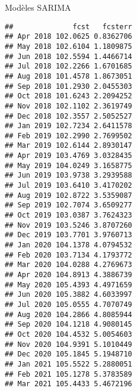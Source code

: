 \documentclass[10pt,xcolor=table,color={dvipsnames,usenames},ignorenonframetext,usepdftitle=false,french]{beamer}
\newenvironment{Shaded}{\begin{snugshade}}{\end{snugshade}}
\newcommand{\CommentTok}[1]{\textcolor[rgb]{0.56,0.35,0.01}{\textit{#1}}}
\newcommand{\DataTypeTok}[1]{\textcolor[rgb]{0.13,0.29,0.53}{#1}}
\newcommand{\DecValTok}[1]{\textcolor[rgb]{0.00,0.00,0.81}{#1}}
\newcommand{\KeywordTok}[1]{\textcolor[rgb]{0.13,0.29,0.53}{\textbf{#1}}}
\newcommand{\NormalTok}[1]{#1}
\newcommand{\OperatorTok}[1]{\textcolor[rgb]{0.81,0.36,0.00}{\textbf{#1}}}
\newcommand{\StringTok}[1]{\textcolor[rgb]{0.31,0.60,0.02}{#1}}
\begin{document}
\begin{frame}[fragile]{Modèles SARIMA}
\protect\hypertarget{moduxe8les-sarima-4}{}

\footnotesize

\begin{Shaded}
\end{Shaded}

\begin{verbatim}
##              fcst   fcsterr
## Apr 2018 102.0625 0.8362706
## May 2018 102.6104 1.1809875
## Jun 2018 102.5594 1.4466714
## Jul 2018 102.2266 1.6701685
## Aug 2018 101.4578 1.8673051
## Sep 2018 101.2930 2.0455303
## Oct 2018 101.6243 2.2094252
## Nov 2018 102.1102 2.3619749
## Dec 2018 102.3557 2.5052527
## Jan 2019 102.7234 2.6411578
## Feb 2019 102.2990 2.7699502
## Mar 2019 102.6144 2.8930147
## Apr 2019 103.4769 3.0328435
## May 2019 104.0249 3.1658775
## Jun 2019 103.9738 3.2939588
## Jul 2019 103.6410 3.4170202
## Aug 2019 102.8722 3.5359087
## Sep 2019 102.7074 3.6509277
## Oct 2019 103.0387 3.7624323
## Nov 2019 103.5246 3.8707260
## Dec 2019 103.7701 3.9760713
## Jan 2020 104.1378 4.0794532
## Feb 2020 103.7134 4.1793772
## Mar 2020 104.0288 4.2769673
## Apr 2020 104.8913 4.3886739
## May 2020 105.4393 4.4971659
## Jun 2020 105.3882 4.6033997
## Jul 2020 105.0555 4.7070749
## Aug 2020 104.2866 4.8085944
## Sep 2020 104.1218 4.9080145
## Oct 2020 104.4532 5.0054603
## Nov 2020 104.9391 5.1010449
## Dec 2020 105.1845 5.1948710
## Jan 2021 105.5522 5.2880051
## Feb 2021 105.1278 5.3783589
## Mar 2021 105.4433 5.4672196
\end{verbatim}

\end{frame}
\end{document}
